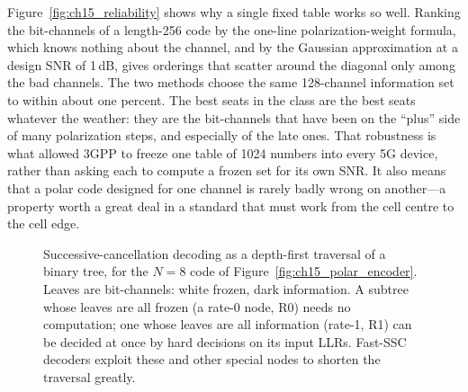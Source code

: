 Figure~\ref{fig:ch15_reliability} shows why a single fixed table works so well. Ranking the
bit-channels of a length-256 code by the one-line polarization-weight formula, which knows nothing
about the channel, and by the Gaussian approximation at a design SNR of 1\,dB, gives orderings that
scatter around the diagonal only among the bad channels. The two methods choose the same 128-channel
information set to within about one percent. The best seats in the class are the best seats whatever
the weather: they are the bit-channels that have been on the ``plus'' side of many polarization
steps, and especially of the late ones. That robustness is what allowed 3GPP to freeze one table of
1024 numbers into every 5G device, rather than asking each to compute a frozen set for its own SNR.
It also means that a polar code designed for one channel is rarely badly wrong on another---a
property worth a great deal in a standard that must work from the cell centre to the cell edge.

\begin{figure}[htbp]\centering
{}
\caption{Successive-cancellation decoding as a depth-first traversal of a binary tree, for the
$N=8$ code of Figure~\ref{fig:ch15_polar_encoder}. Leaves are bit-channels: white frozen, dark
information. A subtree whose leaves are all frozen (a rate-0 node, R0) needs no computation; one
whose leaves are all information (rate-1, R1) can be decided at once by hard decisions on its input
LLRs. Fast-SSC decoders exploit these and other special nodes to shorten the traversal greatly.}
\label{fig:ch15_sc_tree}
\end{figure}

